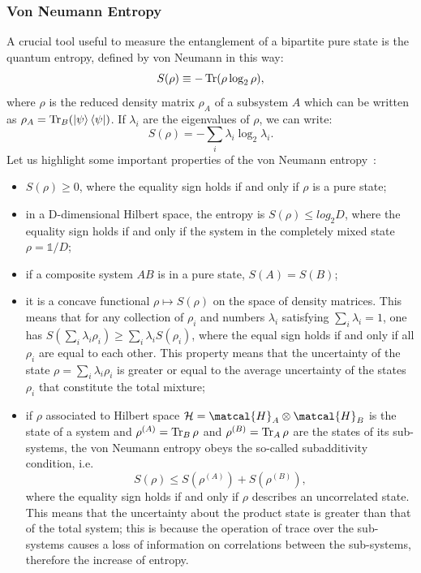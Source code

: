 \subsubsection{Von Neumann Entropy}
A crucial tool useful to measure the entanglement of a bipartite pure state is the quantum entropy, defined by von Neumann in this way:
\begin{equation}
    S(\rho) \equiv -\operatorname{Tr} ( \rho \log_2\rho),
\end{equation}
where $\rho$ is the reduced density matrix $\rho_A$ of a subsystem $A$ which can be written as $\rho_A = \operatorname{Tr}_B (\ket{\psi}\bra{\psi})$. If $\lambda_i$ are the eigenvalues of $\rho$, we can write:
\begin{equation*}
    S(\rho) = -\sum_i \lambda_i \log_2 \lambda_i.
\end{equation*}
Let us highlight some important properties of the von Neumann entropy~\cite{nielsen_chuang, pet_breuer:open_quantum}:
\begin{itemize}
    \item $S(\rho) \geq 0$, where the equality sign holds if and only if $\rho$ is a pure state;
    \item in a D-dimensional Hilbert space, the entropy is $S(\rho) \leq log_2 D$, where the equality sign holds if and only if the system in the completely mixed state $\rho = \mathds{1}/D$;
    \item if a composite system $AB$ is in a pure state, $S(A) = S(B)$;
    \item it is a concave functional $\rho \mapsto S(\rho)$ on the space of density matrices. This means that for any collection of $\rho_i$ and numbers $\lambda_i$ satisfying $\sum_i \lambda_i = 1$, one has $S(\sum_i \lambda_i \rho_i) \geq \sum_i \lambda_i S(\rho_i)$, where the equal sign holds if and only if all $\rho_i$ are equal to each other. This property means that the uncertainty of the state $\rho = \sum_i \lambda_i \rho_i$ is greater or equal to the average uncertainty of the states $\rho_i$ that constitute the total mixture;
    \item if $\rho$ associated to Hilbert space $ \mathcal{H} = \matcal{H}_A \otimes \matcal{H}_B$ is the state of a system and $\rho^{(A)} = \operatorname{Tr}_B \rho$ and $\rho^{(B)} = \operatorname{Tr}_A \rho$ are the states of its sub-systems, the von Neumann entropy obeys the so-called subadditivity condition, i.e.
    \begin{equation*}
        S(\rho) \leq S(\rho^{(A)}) + S(\rho^{(B)}),
    \end{equation*}
    where the equality sign holds if and only if $\rho$ describes an uncorrelated state. This means that the uncertainty about the product state is greater than that of the total system; this is because the operation of trace over the sub-systems causes a loss of information on correlations between the sub-systems, therefore the increase of entropy.
\end{itemize}

